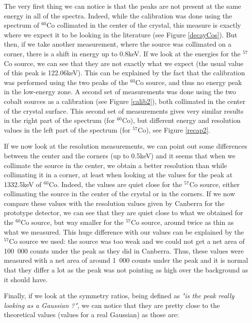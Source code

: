 \documentclass[11pt,a4paper]{article}
\begin{document}
The very first thing we can notice is that the peaks are not present at the same energy in all of the spectra. Indeed, while the calibration was done using the spectrum of $^{60}$Co collimated in the center of the crystal, this measure is exactly where we expect it to be looking in the literature (see Figure \ref{decayCos}). But then, if we take another measurement, where the source was collimated on a corner, there is a shift in energy up to 0.8keV. If we look at the energies for the $^{57}$Co source, we can see that they are not exactly what we expect (the usual value of this peak is 122.06keV). This can be explained by the fact that the calibration was performed using the two peaks of the $^{60}$Co source, and thus no energy peak in the low-energy zone. A second set of measurements was done using the two cobalt sources as a calibration (see Figure \ref{calib2}), both collimated in the center of the crystal surface. This second set of measurements gives very similar results in the right part of the spectrum (for $^{60}$Co), but different energy and resolution values in the left part of the spectrum (for $^{57}$Co), see Figure \ref{recap2}.


If we now look at the resolution measurements, we can point out some differences between the center and the corners (up to 0.5keV) and it seems that when we collimate the source in the center, we obtain a better resolution than while collimating it in a corner, at least when looking at the values for the peak at 1332.5keV of $^{60}$Co. Indeed, the values are quiet close for the $^{57}$Co source, either collimating the source in the center of the crystal or in the corners. If we now compare these values with the resolution values given by Canberra for the prototype detector, we can see that they are quiet close to what we obtained for the $^{60}$Co source, but way smaller for the $^{57}$Co source, around twice as thin as what we measured. This huge difference with our values can be explained by the $^{57}$Co source we used: the source was too weak and we could not get a net area of 100~000 counts under the peak as they did in Canberra. Thus, these values were measured with a net area of around 1~000 counts under the peak and it is normal that they differ a lot as the peak was not pointing as high over the background as it should have.

Finally, if we look at the symmetry ratios, being defined as \textit{"is the peak really looking as a Gaussian ?"}, we can notice that they are pretty close to the theoretical values (values for a real Gaussian) as those are:
\end{document}

